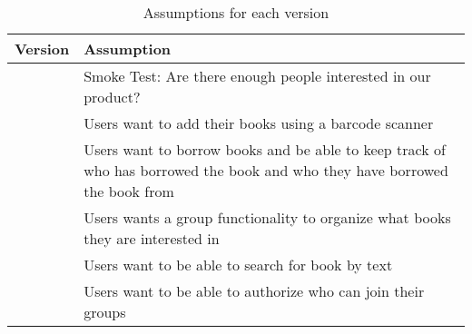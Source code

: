 \begin{table}[]
\centering
\begin{tabular}{|L{2cm}|L{11cm}|}
\hline
Version & Assumption \\
\hline
{} & Smoke Test: Are there enough people interested in our product? \\
\hline
{} & Users want to add their books using a barcode scanner \\
\hline
{} & Users want to borrow books and be able to keep track of who has borrowed the book and who they have borrowed the book from \\
\hline
{} & Users wants a group functionality to organize what books they are interested in \\
\hline
{} & Users want to be able to search for book by text \\ 
\hline
{} & Users want to be able to authorize who can join their groups
\\\hline
\end{tabular}
\caption{Assumptions for each version}
\label{assumptions}
\end{table}